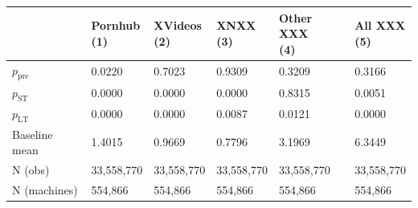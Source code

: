 \begin{tabular}[t]{llllll}
\toprule
 & \shortstack{Pornhub\\(1)} & \shortstack{XVideos\\(2)} & \shortstack{XNXX\\(3)} & \shortstack{Other XXX\\(4)} & \shortstack{All XXX\\(5)} \\
\midrule
$p_{\mathrm{pre}}$ & 0.0220 & 0.7023 & 0.9309 & 0.3209 & 0.3166 \\
$p_{\mathrm{ST}}$ & 0.0000 & 0.0000 & 0.0000 & 0.8315 & 0.0051 \\
$p_{\mathrm{LT}}$ & 0.0000 & 0.0000 & 0.0087 & 0.0121 & 0.0000 \\
\addlinespace
\addlinespace
Baseline mean & 1.4015 & 0.9669 & 0.7796 & 3.1969 & 6.3449 \\
N (obs) & 33,558,770 & 33,558,770 & 33,558,770 & 33,558,770 & 33,558,770 \\
N (machines) & 554,866 & 554,866 & 554,866 & 554,866 & 554,866 \\
\bottomrule
\end{tabular}
